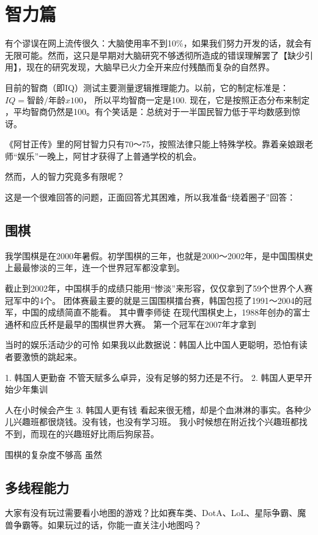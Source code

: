 \chapter{智力篇}
有个谬误在网上流传很久：大脑使用率不到10\%，如果我们努力开发的话，就会有无限可能。然而，这只是早期对大脑研究不够透彻所造成的错误理解罢了【缺少引用】，现在的研究发现，大脑早已火力全开来应付残酷而复杂的自然界。

目前的智商（即IQ）测试主要测量逻辑推理能力。以前，它的制定标准是：$
IQ = 智龄 / 年龄 x 100 $， 所以平均智商一定是100. 现在，它是按照正态分布来制定 ，平均智商仍然是100。有个笑话是：总统对于一半国民智力低于平均数感到惊讶。

《阿甘正传》里的阿甘智力只有70～75，按照法律只能上特殊学校。靠着亲娘跟老师“娱乐”一晚上，阿甘才获得了上普通学校的机会。

然而，人的智力究竟多有限呢？

这是一个很难回答的问题，正面回答尤其困难，所以我准备“绕着圈子”回答：

\section{围棋}
我学围棋是在2000年暑假。初学围棋的三年，也就是2000～2002年，是中国围棋史上最最惨淡的三年，连一个世界冠军都没拿到。



截止到2002年，中国棋手的成绩只能用“惨淡”来形容，仅仅拿到了59个世界个人赛冠军中的4个。
团体赛最主要的就是三国围棋擂台赛，韩国包揽了1991～2004的冠军，中国的成绩简直不能看。
其中曹李师徒
在现代围棋史上，1988年创办的富士通杯和应氏杯是最早的围棋世界大赛。
第一个冠军在2007年才拿到

当时的娱乐活动少的可怜
如果我以此数据说：韩国人比中国人更聪明，恐怕有读者要激愤的跳起来。

1.  韩国人更勤奋
不管天赋多么卓异，没有足够的努力还是不行。
2.  韩国人更早开始少年集训

人在小时候会产生
3.  韩国人更有钱
看起来很无稽，却是个血淋淋的事实。各种少儿兴趣班都很烧钱。没有钱，也没有学习班。
我小时候想在附近找个兴趣班都找不到，而现在的兴趣班好比雨后狗尿苔。

围棋的复杂度不够高
虽然

\section{多线程能力}
大家有没有玩过需要看小地图的游戏？比如赛车类、DotA、LoL、星际争霸、魔兽争霸等。如果玩过的话，你能一直关注小地图吗？

